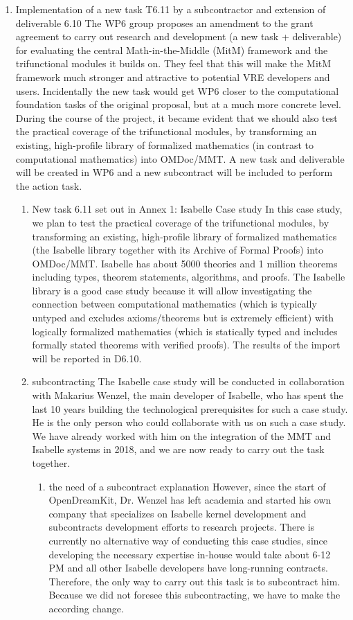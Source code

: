 \begin{enumerate}
\item Implementation of a new task T6.11 by a subcontractor and extension of deliverable 6.10 
The WP6 group proposes an amendment to the grant agreement to carry out research and development (a new task + deliverable) for evaluating the central Math-in-the-Middle (MitM) framework and the trifunctional modules it builds on. They feel that this will make the MitM framework much stronger and attractive to potential VRE developers and users. Incidentally the new task would get WP6 closer to the computational foundation tasks of the original proposal, but at a much more concrete level. During the course of the project, it became evident that we should also test the practical coverage of the trifunctional modules, by transforming an existing, high-profile library of formalized mathematics (in contrast to computational mathematics) into OMDoc/MMT. A new task and deliverable will be created in WP6 and a new subcontract will be included to perform the action task.

\begin{enumerate}
\item New task 6.11 set out in Annex 1: Isabelle Case study
In this case study, we plan to test the practical coverage of the trifunctional modules, by transforming an existing, high-profile library of formalized mathematics (the Isabelle library together with its Archive of Formal Proofs) into OMDoc/MMT. Isabelle has about 5000 theories and 1 million theorems including types, theorem statements, algorithms, and proofs. The Isabelle library is a good case study because it will allow investigating the connection between computational mathematics (which is typically untyped and excludes axioms/theorems but is extremely efficient) with logically formalized mathematics (which is statically typed and includes formally stated theorems with verified proofs). The results of the import will be reported in D6.10.

\item subcontracting
The Isabelle case study will be conducted in collaboration with Makarius Wenzel, the main developer of Isabelle, who has spent the last 10 years building the technological prerequisites for such a case study. He is the only person who could collaborate with us on such a case study. We have already worked with him on the integration of the MMT and Isabelle systems in 2018, and we are now ready to carry out the task together.

\begin{enumerate}
\item the need of a subcontract explanation
However, since the start of OpenDreamKit, Dr. Wenzel has left academia and started his own company that specializes on Isabelle kernel development and subcontracts development efforts to research projects. There is currently no alternative way of conducting this case studies, since developing the necessary expertise in-house would take about 6-12 PM and all other Isabelle developers have long-running contracts. Therefore, the only way to carry out this task is to subcontract him. Because we did not foresee this subcontracting, we have to make the according change.


\end{enumerate}
\end{enumerate}
\end{enumerate}
